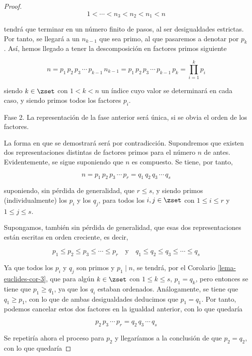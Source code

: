 \begin{proof}
  $$ 1 < \cdots < n_3 < n_2 < n_1 < n $$

  \noindent tendrá que terminar en un número finito de pasos, al ser
  desigualdades estrictas. Por tanto, se llegará a un $n_{k-1}$ que sea
  primo, al que pasaremos a denotar por $p_k$. Así, hemos llegado a tener la
  descomposición en factores primos siguiente

  $$ n = p_1 \, p_2 \, p_3 \, \cdots \, p_{k-1} \, n_{k-1} = p_1 \, p_2 \,
  p_3 \, \cdots \, p_{k-1} \, p_k = \prod_{i=1}^k p_i $$

  \noindent siendo $k \in \zset$ con $1 < k < n$ un índice cuyo valor se
  determinará en cada caso, y siendo primos todos los factores $p_i$.

  Fase 2. La representación de la fase anterior será única, si se obvia el
  orden de los factores.

  La forma en que se demostrará será por contradicción. Supondremos que
  existen dos representaciones distintas de factores primos para el número
  $n$ de antes. Evidentemente, se sigue suponiendo que $n$ es compuesto. Se
  tiene, por tanto,

  $$ n = p_1 \, p_2 \, p_3 \, \cdots \, p_r = q_1 \, q_2 \, q_3 \, \cdots \,
  q_s $$

  \noindent suponiendo, sin pérdida de generalidad, que $r \leq s$, y siendo
  primos (individualmente) los $p_i$ y los $q_j$, para todos los $i, j \in
  \zset$ con $1 \leq i \leq r$ y $1 \leq j \leq s$.

  Supongamos, también sin pérdida de generalidad, que esas dos
  representaciones están escritas en orden creciente, es decir,

  $$ p_1 \leq p_2 \leq p_3 \leq \cdots \leq p_r \quad \text{y} \quad q_1
  \leq q_2 \leq q_3 \leq \cdots \leq q_s $$

  Ya que todos los $p_i$ y $q_j$ son primos y $p_1 \mid n$, se tendrá, por
  el Corolario \ref{lema-euclides-cor-3}, que para algún $k \in \zset$ con
  $1 \leq k \leq s$, $p_1 = q_k$, pero entonces se tiene que $p_1 \geq q_1$,
  ya que los $q_i$ estaban ordenados. Análogamente, se tiene que $q_1 \geq
  p_1$, con lo que de ambas desigualdades deducimos que $p_1 = q_1$. Por
  tanto, podemos cancelar estos dos factores en la igualdad anterior, con lo
  que quedaría

  $$ p_2 \, p_3 \, \cdots \, p_r = q_2 \, q_3 \, \cdots \, q_s $$

  Se repetiría ahora el proceso para $p_2$ y llegaríamos a la conclusión de
  que $p_2 = q_2$, con lo que quedaría


\end{proof}

